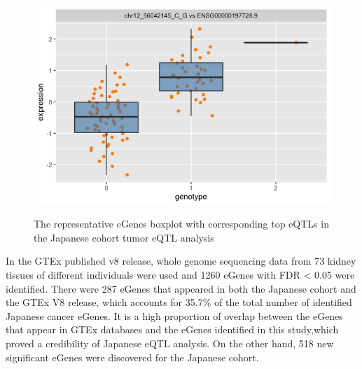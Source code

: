 \begin{figure}
{\begin{minipage}[b]{0.4\textwidth}
			\includegraphics[width=1\textwidth]{figures/RSP26.png} 
		\end{minipage}
		\label{fig:RSP26}
	}
	\caption{The representative eGenes boxplot with corresponding top eQTLs in the Japanese cohort tumor eQTL analysis}
	\label{fig:4-significant}
\end{figure}

In the GTEx published v8 release, whole genome sequencing data from 73 kidney tissues of different individuals were used and 1260 eGenes with FDR < 0.05 were identified. There were 287 eGenes that appeared in both the Japanese cohort and the GTEx V8 release, which accounts for 35.7\% of the total number of identified Japanese cancer eGenes. It is a high proportion of overlap between the eGenes that appear in GTEx databases and the eGenes identified in this study,which proved a credibility of Japanese eQTL analysis. On the other hand, 518 new significant eGenes were discovered for the Japanese cohort.

